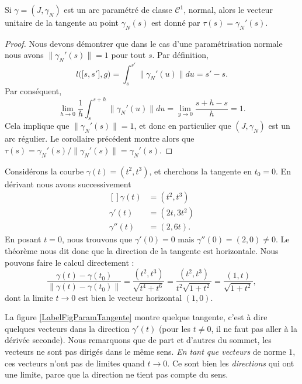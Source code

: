 \begin{corollary}       \label{CorUnitTgtaugpnorma}
Si $\gamma=(J,\gamma_N)$ est un arc paramétré de classe $\mathcal{C}^1$, normal, alors le vecteur unitaire de la tangente au point $\gamma_N(s)$ est donné par $\tau(s)=\gamma_N'(s)$.
\end{corollary}

\begin{proof}
Nous devons démontrer que dans le cas d'une paramétrisation normale nous avons $\| \gamma_N'(s) \|=1$ pour tout $s$. Par définition,
\begin{equation}
    l\big( \mathopen[ s , s' \mathclose],g \big)=\int_s^{s'}\| \gamma_N'(u) \|du=s'-s.
\end{equation}
Par conséquent,
\begin{equation}
    \lim_{h\to 0} \frac{1}{ h }\int_s^{s+h}\| \gamma_N'(u) \|du=\lim_{y\to 0} \frac{ s+h-s }{ h }=1.
\end{equation}
Cela implique que $\| \gamma_N'(s) \|=1$, et donc en particulier que $(J,\gamma_N)$ est un arc régulier. Le corollaire précédent montre alors que $\tau(s)=\gamma_N'(s)/\| \gamma_N'(s) \|=\gamma_N'(s)$.
\end{proof}

\begin{example}
Considérons la courbe $\gamma(t)=(t^2,t^3)$, et cherchons la tangente en $t_0=0$. En dérivant nous avons successivement 
\begin{equation}
    \begin{aligned}[]
        \gamma(t)&=(t^2,t^3)\\
        \gamma'(t)&=(2t,3t^2)\\
        \gamma''(t)&=(2,6t).
    \end{aligned}
\end{equation}
En posant $t=0$, nous trouvons que $\gamma'(0)=0$ mais $\gamma''(0)=(2,0)\neq 0$. Le théorème nous dit donc que la direction de la tangente est horizontale. Nous pouvons faire le calcul directement :
\begin{equation}
    \frac{ \gamma(t)-\gamma(t_0) }{ \| \gamma(t)-\gamma(t_0) \| }=\frac{ (t^2,t^3) }{ \sqrt{t^4+t^6} }=\frac{ (t^2,t^3) }{ t^2\sqrt{1+t^2} }=\frac{ (1,t) }{ \sqrt{1+t^2} },
\end{equation}
dont la limite \( t\to 0\) est bien le vecteur horizontal $(1,0)$.

La figure \ref{LabelFigParamTangente} montre quelque tangente, c'est à dire quelques vecteurs dans la direction $\gamma'(t)$ (pour les $t\neq 0$, il ne faut pas aller à la dérivée seconde). Nous remarquons que de part et d'autres du sommet, les vecteurs ne sont pas dirigés dans le même sens. \emph{En tant que vecteurs} de norme $1$, ces vecteurs n'ont pas de limites quand $t\to 0$. Ce sont bien les \emph{directions} qui ont une limite, parce que la direction ne tient pas compte du sens.
\newcommand{\CaptionFigParamTangente}{Quelques tangentes de la courbe $\gamma(t)=(t^2,t^3)$.}


\end{example}

